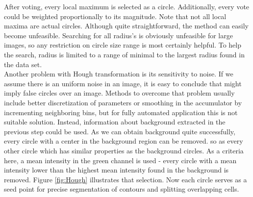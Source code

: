 After voting, every local maximum is selected as a circle. Additionally, every vote could be weighted proportionally to its magnitude. Note that not all local maxima are actual circles. Although quite straightforward, the method can easily become unfeasible. Searching for all radius's is obviously unfeasible for large images, so any restriction on circle size range is most certainly helpful. To help the search, radius is limited to a range of minimal to the largest radius found in the data set. \\

Another problem with Hough transformation is its sensitivity to noise. If we assume there is an uniform noise in an image, it is easy to conclude that might imply false circles over an image. Methods to overcome that problem usually include better discretization of parameters or smoothing in the accumulator by incrementing neighboring bins, but for fully automated application this is not suitable solution. Instead, information about background extracted in the previous step could be used. As we can obtain background quite successfully, every circle with a center in the background region can be removed. so as every other circle which has similar properties as the background circles. As a criteria here, a mean intensity in the green channel is used - every circle with a mean intensity lower than the highest mean intensity found in the background is removed. Figure \ref{fig:Hough} illustrates that selection. Now each circle serves as a seed point for precise segmentation of contours and splitting overlapping cells.

